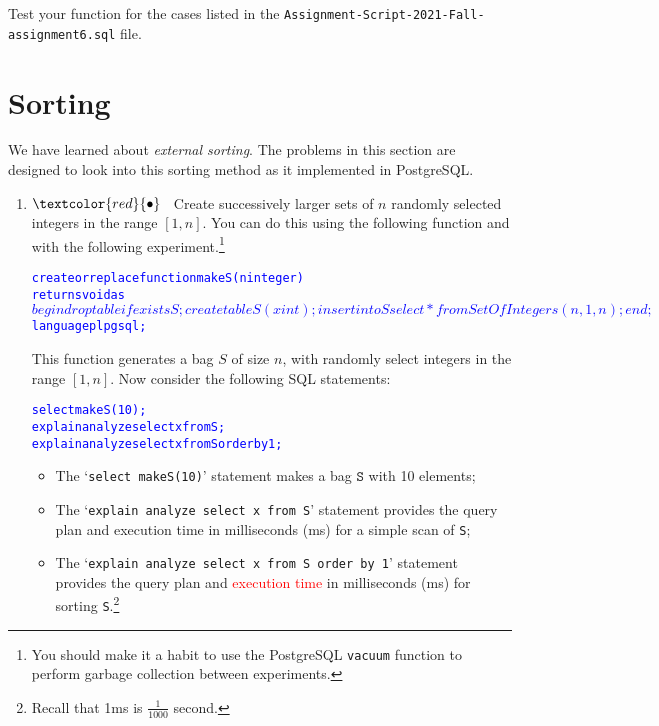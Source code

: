 \documentclass{article}
\newcommand{\redbullet}{$\textcolor{red}{\bullet}$}
\newcommand{\blue}[1]{{\color{blue}#1}}
\begin{document}
Test your function for the cases listed in the {\tt Assignment-Script-2021-Fall-assignment6.sql} file.

\newpage
\section{Sorting}

We have learned about \emph{external sorting}.   The problems in this section are designed to look into this sorting method as it implemented in PostgreSQL.

\begin{enumerate}[resume]
\item \redbullet\ \label{sortTime}   Create successively larger sets of $n$ randomly selected integers in the range $[1,n]$.     You can do this  using the following function and with the following experiment.\footnote{You should make it a habit to use the PostgreSQL \blue{\tt vacuum} function to perform garbage collection between experiments.} 

{\small \begin{alltt}
\textcolor{blue}{create or replace function makeS (n integer)
returns void as
$$
begin 
    drop table if exists S;
    create table S (x int);
    insert into S select * from SetOfIntegers(n,1,n);
end;    
$$ language plpgsql;}
\end{alltt}}
This function generates a bag $S$ of size $n$, with randomly select integers in the range $[1,n]$.
Now consider the following SQL statements:
\begin{center}
\begin{alltt}
\textcolor{blue}{select makeS(10);
explain analyze {select x from S;}
explain analyze {select x from S order by 1;}}
\end{alltt}
\end{center}

\begin{itemize}
\item The `\blue{\tt select makeS(10)}' statement makes a bag $\mathtt{S}$ with 10 elements;
\item The `\blue{\tt explain analyze {select x from S}}' statement provides the query plan and execution time in milliseconds (ms) for a simple scan of {\tt S};
\item The `\blue{\tt explain analyze {select x from S order by 1}}' statement provides the query plan and \textcolor{red}{execution time} in milliseconds (ms) for sorting {\tt S}.\footnote{Recall that 1ms is $\frac{1}{1000}$ second.}
\end{itemize}


\end{enumerate}
\end{document}
